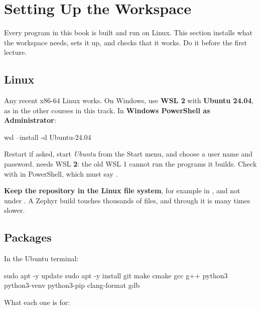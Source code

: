 
\section{Setting Up the Workspace}
\label{c1:sec:settinguptheworksp}\label{c1:app:a}
Every program in this book is built and run on Linux. This section installs what the workspace
needs, sets it up, and checks that it works. Do it before the first lecture.

\subsection{Linux}
Any recent x86-64 Linux works. On Windows, use \textbf{WSL 2} with \textbf{Ubuntu 24.04}, as in the
other courses in this track. In \textbf{Windows PowerShell as Administrator}:

\begin{shell}
wsl --install -d Ubuntu-24.04
\end{shell}

\noindent Restart if asked, start \emph{Ubuntu} from the Start menu, and choose a user name and
password.  needs WSL \textbf{2}: the old WSL 1 cannot run the programs it builds.
Check with  in PowerShell, which must say .

\textbf{Keep the repository in the Linux file system}, for example in , and not
under . A Zephyr build touches thousands of files, and through  it is many
times slower.

\subsection{Packages}
In the Ubuntu terminal:

\begin{shell}
sudo apt -y update
sudo apt -y install git make cmake gcc g++ python3 python3-venv python3-pip clang-format gdb
\end{shell}

\noindent What each one is for:

